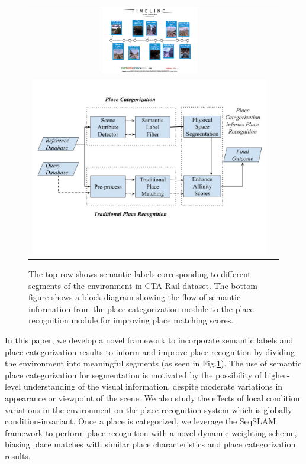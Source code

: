 \documentclass[letterpaper, 10 pt, conference]{ieeeconf}  %
\begin{document}
\begin{figure}
\centering
\begin{tabular}{cc}
	\includegraphics[clip, trim=2cm 4cm 2cm 4cm,width=6.5cm,height=3.0cm]{cta-dataset-segmentation-1}\\
	
	\includegraphics[clip, trim=0cm 4cm 0cm 2cm,scale=0.2]{flowchart}
\end{tabular}
	\caption{ The top row shows semantic labels corresponding to different segments of the environment in CTA-Rail dataset. The bottom figure shows a block diagram showing the flow of semantic information from the place categorization module to the place recognition module for improving place matching scores.}
	\label{fig:flowchart}
\end{figure}


In this paper, we develop a novel framework to incorporate semantic labels and place categorization results to inform and improve place recognition by dividing the environment into meaningful segments (as seen in Fig.\ref{fig:flowchart}). The use of semantic place categorization for segmentation is motivated by the possibility of higher-level understanding of the visual information, despite moderate variations in appearance or viewpoint of the scene. We also study the effects of local condition variations in the environment on the place recognition system which is globally condition-invariant. Once a place is categorized, we leverage the SeqSLAM \cite{Milford2012} framework to perform place recognition with a novel dynamic weighting scheme, biasing place matches with similar place characteristics and place categorization results. 
\end{document}
